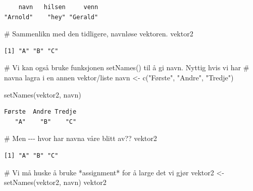 \documentclass[
  letterpaper,
  DIV=11,
  numbers=noendperiod]{scrreprt}
\newenvironment{Shaded}{\begin{snugshade}}{\end{snugshade}}
\newcommand{\CommentTok}[1]{\textcolor[rgb]{0.37,0.37,0.37}{#1}}
\newcommand{\FunctionTok}[1]{\textcolor[rgb]{0.28,0.35,0.67}{#1}}
\newcommand{\NormalTok}[1]{\textcolor[rgb]{0.00,0.23,0.31}{#1}}
\newcommand{\OtherTok}[1]{\textcolor[rgb]{0.00,0.23,0.31}{#1}}
\newcommand{\StringTok}[1]{\textcolor[rgb]{0.13,0.47,0.30}{#1}}
\begin{document}
\begin{verbatim}
    navn   hilsen     venn 
"Arnold"    "hey" "Gerald" 
\end{verbatim}

\begin{Shaded}
\begin{Highlighting}[]
\CommentTok{\# Sammenlikn med den tidligere, navnløse vektoren. }
\NormalTok{vektor2}
\end{Highlighting}
\end{Shaded}

\begin{verbatim}
[1] "A" "B" "C"
\end{verbatim}

\begin{Shaded}
\begin{Highlighting}[]
\CommentTok{\# Vi kan også bruke funksjonen \textasciigrave{}setNames()\textasciigrave{} til å gi navn. Nyttig hvis vi har}
\CommentTok{\# navna lagra i en annen vektor/liste}
\NormalTok{navn }\OtherTok{\textless{}{-}} \FunctionTok{c}\NormalTok{(}\StringTok{"Første"}\NormalTok{, }\StringTok{"Andre"}\NormalTok{, }\StringTok{"Tredje"}\NormalTok{)}

\FunctionTok{setNames}\NormalTok{(vektor2, navn)}
\end{Highlighting}
\end{Shaded}

\begin{verbatim}
Første  Andre Tredje 
   "A"    "B"    "C" 
\end{verbatim}

\begin{Shaded}
\begin{Highlighting}[]
\CommentTok{\# Men {-}{-}{-} hvor har navna våre blitt av??}
\NormalTok{vektor2}
\end{Highlighting}
\end{Shaded}

\begin{verbatim}
[1] "A" "B" "C"
\end{verbatim}

\begin{Shaded}
\begin{Highlighting}[]
\CommentTok{\# Vi må huske å bruke *assignment* for å large det vi gjør}
\NormalTok{vektor2 }\OtherTok{\textless{}{-}} \FunctionTok{setNames}\NormalTok{(vektor2, navn)}
\NormalTok{vektor2}
\end{Highlighting}
\end{Shaded}
\end{document}

